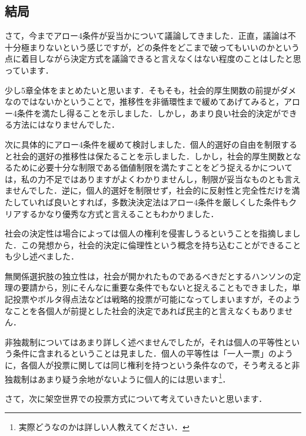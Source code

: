 \subsection{結局}
さて，今までアロー4条件が妥当かについて議論してきました．正直，議論は不十分極まりないという感じですが，どの条件をどこまで破ってもいいのかという点に着目しながら決定方式を議論できると言えなくはない程度のことはしたと思っています．

少し5章全体をまとめたいと思います．そもそも，社会的厚生関数の前提がダメなのではないかということで，推移性を非循環性まで緩めてあげてみると，アロー4条件を満たし得ることを示しました．しかし，あまり良い社会的決定ができる方法にはなりませんでした．

次に具体的にアロー4条件を緩めて検討しました．個人的選好の自由を制限すると社会的選好の推移性は保たることを示しました．しかし，社会的厚生関数となるために必要十分な制限である価値制限を満たすことをどう捉えるかについては，私の力不足ではありますがよくわかりませんし，制限が妥当なものとも言えませんでした．逆に，個人的選好を制限せず，社会的に反射性と完全性だけを満たしていれば良いとすれば，多数決決定法はアロー4条件を厳しくした条件もクリアするかなり優秀な方式と言えることもわかりました．

社会の決定性は場合によっては個人の権利を侵害しうるということを指摘しました．この発想から，社会的決定に倫理性という概念を持ち込むことができることも少し述べました．

無関係選択肢の独立性は，社会が開かれたものであるべきだとするハンソンの定理の要請から，別にそんなに重要な条件でもないと捉えることもできました，単記投票やボルタ得点法などは戦略的投票が可能になってしまいますが，そのようなことを各個人が前提とした社会的決定であれば民主的と言えなくもありません．

非独裁制についてはあまり詳しく述べませんでしたが，それは個人の平等性という条件に含まれるということは見ました．個人の平等性は「一人一票」のように，各個人が投票に関しては同じ権利を持つという条件なので，そう考えると非独裁制はあまり疑う余地がないように個人的には思います\footnote{実際どうなのかは詳しい人教えてください．}．

さて，次に架空世界での投票方式について考えていきたいと思います．

